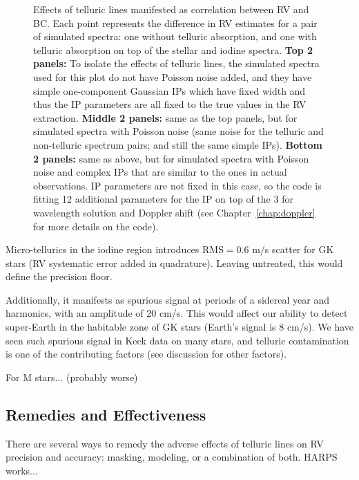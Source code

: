 \begin{figure}
\caption{Effects of telluric lines manifested as correlation between
  RV and BC. Each point represents the difference in RV estimates for
  a pair of simulated spectra: one without telluric absorption, and
  one with telluric absorption on top of the stellar and iodine
  spectra. {\bf Top 2 panels:} To isolate the effects of telluric
  lines, the simulated spectra used for this plot do not have Poisson
  noise added, and they have simple one-component Gaussian IPs which
  have fixed width and thus the IP parameters are all fixed to the
  true values in the RV extraction. {\bf Middle 2 panels:} same as the
  top panels, but for simulated spectra with Poisson noise (same noise
  for the telluric and non-telluric spectrum pairs; and still the same
  simple IPs). {\bf Bottom 2 panels:} same as above, but for simulated
  spectra with Poisson noise and complex IPs that are similar to the
  ones in actual observations. IP parameters are not fixed in this
  case, so the code is fitting 12 additional parameters for the IP on
  top of the 3 for wavelength solution and Doppler shift (see
  Chapter~\ref{chap:doppler} for more details on the code).
\label{telluric:fig:sim}}
\end{figure}


Micro-tellurics in the iodine region introduces RMS$=0.6$ m/s scatter
for GK stars (RV systematic error added in quadrature). Leaving
untreated, this would define the precision floor.

Additionally, it manifests as spurious signal at periods of a sidereal
year and harmonics, with an amplitude of 20 cm/s. This would affect
our ability to detect super-Earth in the habitable zone of GK stars
(Earth's signal is 8 cm/s). We have seen such spurious signal in Keck
data on many stars, and telluric contamination is one of the
contributing factors (see discussion for other factors).

For M stars... (probably worse)


\subsection{Remedies and Effectiveness}\label{keck:telluric:remedies}

There are several ways to remedy the adverse effects of telluric lines
on RV precision and accuracy: masking, modeling, or a combination of
both. HARPS works...

